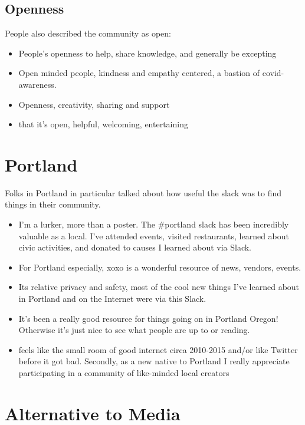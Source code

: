 \documentclass[
]{book}
\providecommand{\tightlist}{%
  \setlength{\itemsep}{0pt}\setlength{\parskip}{0pt}}
\begin{document}
\subsection{Openness}\label{openness}

People also described the community as open:

\begin{itemize}
\tightlist
\item
  People's openness to help, share knowledge, and generally be excepting
\item
  Open minded people, kindness and empathy centered, a bastion of covid-awareness.
\item
  Openness, creativity, sharing and support
\item
  that it's open, helpful, welcoming, entertaining
\end{itemize}

\section{Portland}\label{portland}

Folks in Portland in particular talked about how useful the slack was to find things in their community.

\begin{itemize}
\tightlist
\item
  I'm a lurker, more than a poster. The \#portland slack has been incredibly valuable as a local. I've attended events, visited restaurants, learned about civic activities, and donated to causes I learned about via Slack.
\item
  For Portland especially, xoxo is a wonderful resource of news, vendors, events.
\item
  Its relative privacy and safety, most of the cool new things I've learned about in Portland and on the Internet were via this Slack.
\item
  It's been a really good resource for things going on in Portland Oregon! Otherwise it's just nice to see what people are up to or reading.
\item
  feels like the small room of good internet circa 2010-2015 and/or like Twitter before it got bad. Secondly, as a new native to Portland I really appreciate participating in a community of like-minded local creators
\end{itemize}

\section{Alternative to Media}\label{alternative-to-media}
\end{document}
